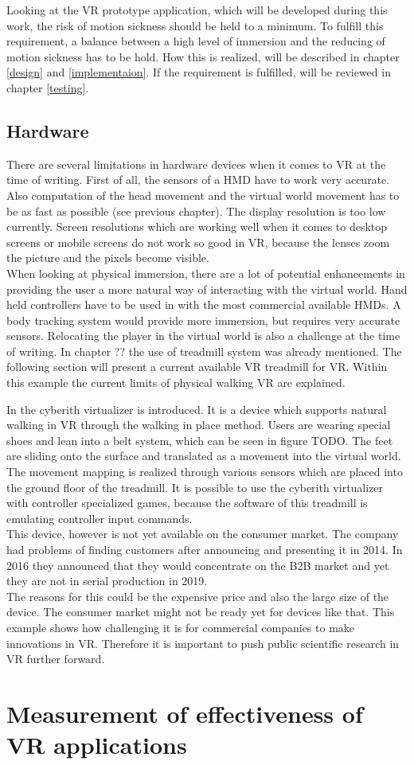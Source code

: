 Looking at the VR prototype application, which will be developed during this work, the risk of motion sickness should be held to a minimum. To fulfill this requirement, a balance between a high level of immersion and the reducing of motion sickness has to be hold. How this is realized, will be described in chapter \ref{design} and \ref{implementaion}. If the requirement is fulfilled, will be reviewed in chapter \ref{testing}.

\subsection{Hardware}
There are several limitations in hardware devices when it comes to VR at the time of writing. First of all, the sensors of a HMD have to work very accurate. Also computation of the head movement and the virtual world movement has to be as fast as possible (see previous chapter). The display resolution is too low currently. Screen resolutions which are working well when it comes to desktop screens or mobile screens do not work so good in VR, because the lenses zoom the picture and the pixels become visible. \\
When looking at physical immersion, there are a lot of potential enhancements in providing the user a more natural way of interacting with the virtual world. Hand held controllers have to be used in with  the most commercial available HMDs. A body tracking system would provide more immersion, but requires very accurate sensors.
Relocating the player in the virtual world is also a challenge at the time of writing. In chapter ?? the use of treadmill system was already mentioned. The following section will present a current available VR treadmill for VR. Within this example the current limits of physical walking VR are explained.

In \cite{Cakmak.2014} the cyberith virtualizer is introduced. It is a device which supports natural walking in VR through the walking in place method. Users are wearing special shoes and lean into a belt system, which can be seen in figure TODO. The feet are sliding onto the surface and translated as a movement into the virtual world. The movement mapping is realized through various sensors which are placed into the ground floor of the treadmill. It is possible to use the cyberith virtualizer with controller specialized games, because the software of this treadmill is emulating controller input commands.\\
This device, however is not yet available on the consumer market. The company had problems of finding customers after announcing and presenting it in 2014. In 2016 they announced that they would concentrate on the B2B market and yet they are not in serial production in 2019. \citep{TODO}\\
The reasons for this could be the expensive price and also the large size of the device. The consumer market might not be ready yet for devices like that. This example shows how challenging it is for commercial companies to make innovations in VR. Therefore it is important to push public scientific research in VR further forward.

\section{Measurement of effectiveness of VR applications}

